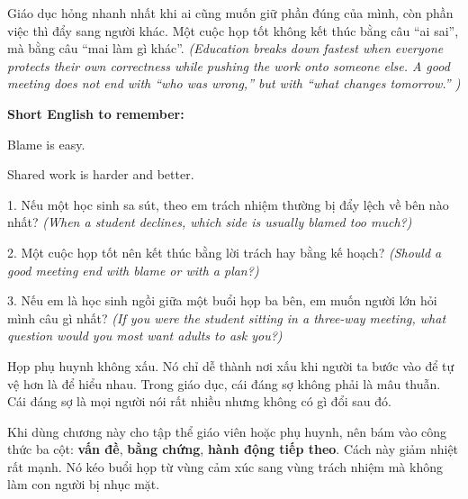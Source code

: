 \begin{baihoc}
Giáo dục hỏng nhanh nhất khi ai cũng muốn giữ phần đúng của mình, còn phần việc thì đẩy sang người khác. Một cuộc họp tốt không kết thúc bằng câu ``ai sai'', mà bằng câu ``mai làm gì khác''. 
\textit{(Education breaks down fastest when everyone protects their own correctness while pushing the work onto someone else. A good meeting does not end with ``who was wrong,'' but with ``what changes tomorrow.'' )}
\end{baihoc}

\begin{ghinhoanh}
\textbf{Short English to remember:}

Blame is easy.

Shared work is harder and better.
\end{ghinhoanh}

\begin{tuhocnhanh}
1. Nếu một học sinh sa sút, theo em trách nhiệm thường bị đẩy lệch về bên nào nhất? \textit{(When a student declines, which side is usually blamed too much?)}

2. Một cuộc họp tốt nên kết thúc bằng lời trách hay bằng kế hoạch? \textit{(Should a good meeting end with blame or with a plan?)}

3. Nếu em là học sinh ngồi giữa một buổi họp ba bên, em muốn người lớn hỏi mình câu gì nhất? \textit{(If you were the student sitting in a three-way meeting, what question would you most want adults to ask you?)}
\end{tuhocnhanh}

\begin{tongketchuong}
Họp phụ huynh không xấu. Nó chỉ dễ thành nơi xấu khi người ta bước vào để tự vệ hơn là để hiểu nhau. Trong giáo dục, cái đáng sợ không phải là mâu thuẫn. Cái đáng sợ là mọi người nói rất nhiều nhưng không có gì đổi sau đó.
\end{tongketchuong}

\begin{goigiaovien}
Khi dùng chương này cho tập thể giáo viên hoặc phụ huynh, nên bám vào công thức ba cột: \textbf{vấn đề}, \textbf{bằng chứng}, \textbf{hành động tiếp theo}. Cách này giảm nhiệt rất mạnh. Nó kéo buổi họp từ vùng cảm xúc sang vùng trách nhiệm mà không làm con người bị nhục mặt.
\end{goigiaovien}

\ngancach